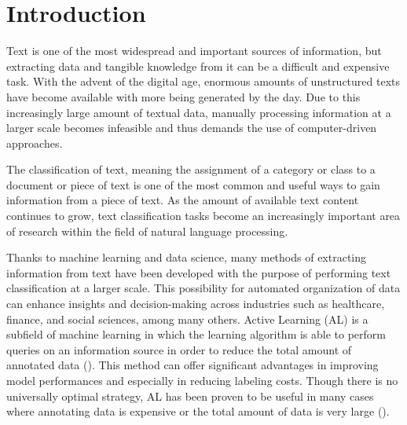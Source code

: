 \documentclass[english,bachelor,ul]{webisthesis} %
\begin{document}
\begin{frontmatter}
\begin{abstract}
This is the \LaTeX{} template for Bachelor and Master theses at Webis. This template contains several hints and conventions on how to structure a thesis, how to cite the work of others, and how to display your results besides plain text. 
\end{abstract}
\end{frontmatter}

\tableofcontents

\chapter{Introduction}

Text is one of the most widespread and important sources of information, but extracting data and tangible knowledge from it can be a difficult and expensive task. With the advent of the digital age, enormous amounts of unstructured texts have become available with more being generated by the day. Due to this increasingly large amount of textual data, manually processing information at a larger scale becomes infeasible and thus demands the use of computer-driven approaches. 

The classification of text, meaning the assignment of a category or class to a document or piece of text is one of the most common and useful ways to gain information from a piece of text. As the amount of available text content continues to grow, text classification tasks become an increasingly important area of research within the field of natural language processing. 

Thanks to machine learning and data science, many methods of extracting information from text have been developed with the purpose of performing text classification at a larger scale. This possibility for automated organization of data can enhance insights and decision-making across industries such as healthcare, finance, and social sciences, among many others. Active Learning (AL) is a subfield of machine learning in which the learning algorithm is able to perform queries on an information source in order to reduce the total amount of annotated data (\cite{settles.tr09}). This method can offer significant advantages in improving model performances and especially in reducing labeling costs. Though there is no universally optimal strategy, AL has been proven to be useful in many cases where annotating data is expensive or the total amount of data is very large (\cite{settles.tr09}). 
\end{document}
